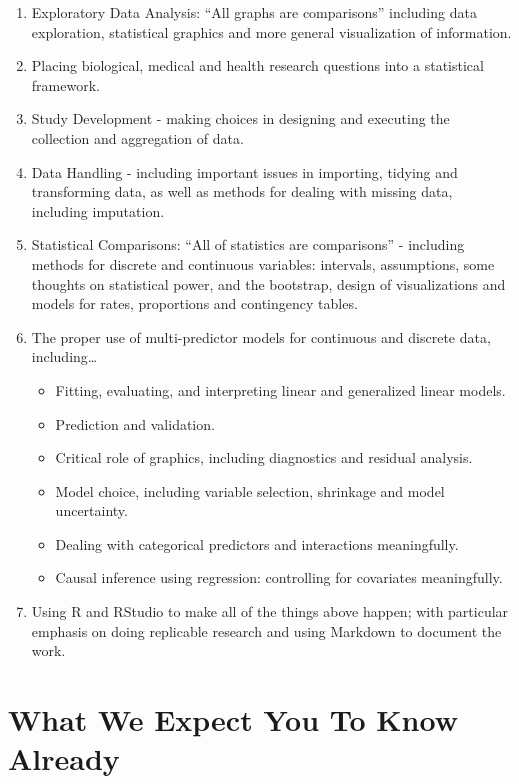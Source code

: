 \documentclass[
]{book}
\providecommand{\tightlist}{%
  \setlength{\itemsep}{0pt}\setlength{\parskip}{0pt}}
\begin{document}
\begin{enumerate}
\def\labelenumi{\arabic{enumi}.}
\tightlist
\item
  Exploratory Data Analysis: ``All graphs are comparisons'' including data exploration, statistical graphics and more general visualization of information.
\item
  Placing biological, medical and health research questions into a statistical framework.
\item
  Study Development - making choices in designing and executing the collection and aggregation of data.
\item
  Data Handling - including important issues in importing, tidying and transforming data, as well as methods for dealing with missing data, including imputation.
\item
  Statistical Comparisons: ``All of statistics are comparisons'' - including methods for discrete and continuous variables: intervals, assumptions, some thoughts on statistical power, and the bootstrap, design of visualizations and models for rates, proportions and contingency tables.
\item
  The proper use of multi-predictor models for continuous and discrete data, including\ldots{}

  \begin{itemize}
  \tightlist
  \item
    Fitting, evaluating, and interpreting linear and generalized linear models.
  \item
    Prediction and validation.
  \item
    Critical role of graphics, including diagnostics and residual analysis.
  \item
    Model choice, including variable selection, shrinkage and model uncertainty.
  \item
    Dealing with categorical predictors and interactions meaningfully.
  \item
    Causal inference using regression: controlling for covariates meaningfully.
  \end{itemize}
\item
  Using R and RStudio to make all of the things above happen; with particular emphasis on doing replicable research and using Markdown to document the work.
\end{enumerate}

\hypertarget{what-we-expect-you-to-know-already-1}{%
\section{What We Expect You To Know Already}\label{what-we-expect-you-to-know-already-1}}
\end{document}
